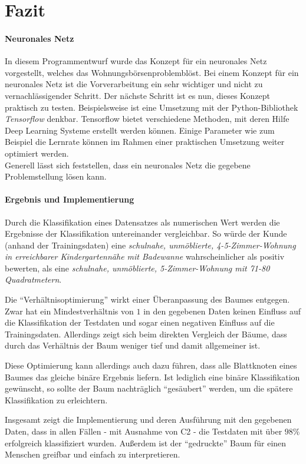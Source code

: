 \section{Fazit}\label{sec:fazit}
\paragraph{Neuronales Netz}
In diesem Programmentwurf wurde das Konzept für ein neuronales Netz vorgestellt,
welches das Wohnungsbörsenproblemblöst.
Bei einem Konzept für ein neuronales Netz ist die Vorverarbeitung ein sehr wichtiger und nicht zu vernachlässigender Schritt.
Der nächste Schritt ist es nun, dieses Konzept praktisch zu testen.
Beispielsweise ist eine Umsetzung mit der Python-Bibliothek \emph{Tensorflow} denkbar.
Tensorflow bietet verschiedene Methoden, mit deren Hilfe Deep Learning Systeme erstellt werden können.
Einige Parameter wie zum Beispiel die Lernrate können im Rahmen einer praktischen Umsetzung weiter optimiert werden. \\
Generell lässt sich feststellen, dass ein neuronales Netz die gegebene Problemstellung lösen kann.

\paragraph{Ergebnis und Implementierung}
Durch die Klassifikation eines Datensatzes als numerischen Wert werden die Ergebnisse der Klassifikation untereinander vergleichbar.
So würde der Kunde (anhand der Trainingsdaten) eine  \emph{schulnahe, unmöblierte, 4-5-Zimmer-Wohnung in erreichbarer Kindergartennähe mit Badewanne} wahrscheinlicher als positiv bewerten,
als eine \emph{schulnahe, unmöblierte, 5-Zimmer-Wohnung mit 71-80 Quadratmetern}.

Die \enquote{Verhältnisoptimierung} wirkt einer Überanpassung des Baumes entgegen.
Zwar hat ein Mindestverhältnis von $1$ in den gegebenen Daten keinen Einfluss auf die Klassifikation der Testdaten und sogar einen negativen Einfluss auf die Trainingsdaten.
Allerdings zeigt sich beim direkten Vergleich der Bäume,
dass durch das Verhältnis der Baum weniger tief und damit allgemeiner ist.

Diese Optimierung kann allerdings auch dazu führen,
dass alle Blattknoten eines Baumes das gleiche binäre Ergebnis liefern.
Ist lediglich eine binäre Klassifikation gewünscht,
so sollte der Baum nachträglich \enquote{gesäubert} werden,
um die spätere Klassifikation zu erleichtern.

Insgesamt zeigt die Implementierung und deren Ausführung mit den gegebenen Daten,
dass in allen Fällen - mit Ausnahme von C2 - die Testdaten mit über $98\%$ erfolgreich klassifiziert wurden.
Außerdem ist der \enquote{gedruckte} Baum für einen Menschen greifbar und einfach zu interpretieren.